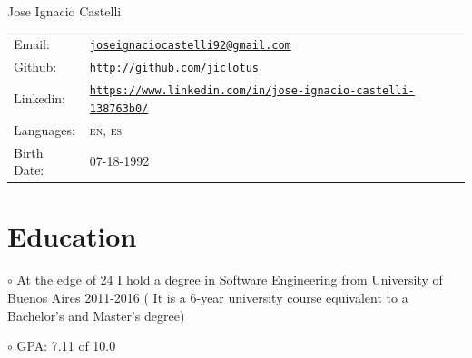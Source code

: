 \documentclass[letterpaper]{article}
\def\name{Jose Ignacio Castelli}
\newenvironment{no-indent-itemize}{
  \begin{list}{}{
    \setlength{\leftmargin}{0em}
  }
}{
  \end{list}
}
\def\bullet{$\circ$\xspace}
\begin{document}
{\huge \name}



\bigskip
\begin{minipage}{0.45\linewidth}
  \begin{tabular}{llll}
    
    
    Email: & \href{mailto:joseignaciocastelli92@gmail.com}{\tt joseignaciocastelli92@gmail.com} \\
     
    
    Github: &\href{http://github.com/jiclotus}{\tt http://github.com/jiclotus}\\
    
    Linkedin: &\href{https://www.linkedin.com/in/jose-ignacio-castelli-138763b0/}{\tt https://www.linkedin.com/in/jose-ignacio-castelli-138763b0/}\\
    
    Languages: & \textsc{en}, \textsc{es}\\
    Birth Date: & \textsc{07-18-1992}
    
    
  \end{tabular}
\end{minipage}


\hfill 
{}


\section*{Education}
\begin{no-indent-itemize}
  \item\bullet At the edge of 24 I hold a degree in Software Engineering from University of Buenos Aires 2011-2016 ( It is a 6-year university course equivalent to a Bachelor's and Master's degree) 
  \item\bullet GPA: 7.11 of 10.0
\end{no-indent-itemize}
\end{document}
